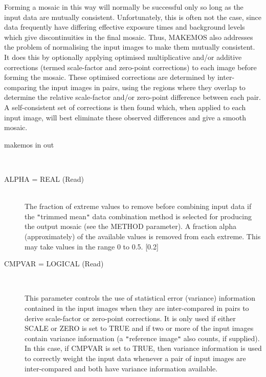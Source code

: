 \documentclass[twoside,11pt]{article}
\renewcommand{\_}{\texttt{\symbol{95}}}
\newcommand{\qt}[1]{{\tt "}#1{\tt "}}
\newcommand{\routine}[1]{{\sc #1}}
\newcommand{\sstusage}[1]{\item[Usage:] \mbox{}
   \begin{description}
      {\ssttt \item #1}
   \end{description}
}
\newcommand{\sstparameters}[1]{
   \item[Parameters:] \mbox{} \\
   \vspace{-3.5ex}
   \begin{description}
      #1
   \end{description}
}
\newcommand{\sstsubsection}[1]{ \item[{#1}] \mbox{} \\}
\newcommand{\sstusage}[1]{\item[Usage:]
      \begin{description}
         {\ssttt #1}
      \end{description}
      \\
   }
\newcommand{\sstparameters}[1]{
      \item[Parameters:] \\
      \begin{description}
         #1
      \end{description}
      \\
   }
\newcommand{\sstsubsection}[1]{\item[{#1}]}
\begin{document}
{{      Forming a mosaic in this way will normally be successful only so
      long as the input data are mutually consistent. Unfortunately,
      this is often not the case, since data frequently have differing
      effective exposure times and background levels which give
      discontinuities in the final mosaic. Thus, \routine{MAKEMOS} also addresses
      the problem of normalising the input images to make them mutually
      consistent. It does this by optionally applying optimised
      multiplicative and/or additive corrections (termed scale-factor
      and zero-point corrections) to each image before forming the
      mosaic.  These optimised corrections are determined by
      inter-comparing the input images in pairs, using the regions where
      they overlap to determine the relative scale-factor and/or
      zero-point difference between each pair.  A self-consistent set
      of corrections is then found which, when applied to each input
      image, will best eliminate these observed differences and give a
      smooth mosaic.
   }
   \sstusage{
      makemos in out
   }
   \sstparameters{
      \sstsubsection{
         ALPHA = \_REAL (Read)
      } {
         The fraction of extreme values to remove before combining
         input data if the \qt{trimmed mean} data combination method is
         selected for producing the output mosaic (see the METHOD
         parameter). A fraction alpha (approximately) of the available
         values is removed from each extreme. This may take values in
         the range 0 to 0.5.
         [0.2]
      }
      \sstsubsection{
         CMPVAR = \_LOGICAL (Read)
      } {
         This parameter controls the use of statistical error
         (variance) information contained in the input images when they
         are inter-compared in pairs to derive scale-factor or
         zero-point corrections. It is only used if either SCALE or
         ZERO is set to TRUE and if two or more of the input images
         contain variance information (a \qt{reference image} also counts,
         if supplied). In this case, if CMPVAR is set to TRUE, then
         variance information is used to correctly weight the input
         data whenever a pair of input images are inter-compared and both
         have variance information available.

}}}
\end{document}
